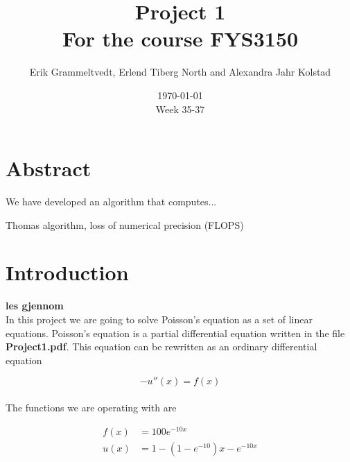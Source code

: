 \documentclass{article}
\begin{document}
\addtocounter{page}{0}

\title{Project 1 \\
      \large For the course FYS3150}
\date{\today \\
    \vspace{1mm}
    \large Week 35-37}

\author{Erik Grammeltvedt, Erlend Tiberg North and Alexandra Jahr Kolstad}

\maketitle

\vspace{1cm}

\tableofcontents



\section{Abstract}


We have developed an algorithm that computes...

Thomas algorithm, loss of numerical precision (FLOPS)


\vspace{1cm}

\section{Introduction}

{\large \bf les gjennom} \\

In this project we are going to solve Poisson's equation as a set of linear equations. Poisson's equation is a partial differential equation written in the file \textbf{Project1.pdf}. This equation can be rewritten as an ordinary differential equation

\begin{equation}
  - u''(x) = f(x)   \label{eq:u(x)diffeq}
\end{equation} \\

The functions we are operating with are

\begin{align}
  f(x) &= 100 e ^{-10 x}    \label{eq:f(x)eq} \\
  u(x) &= 1 - (1- e ^{-10}) x - e ^{- 10 x} \label{eq:u(x)eq}
\end{align} \\
\end{document}
